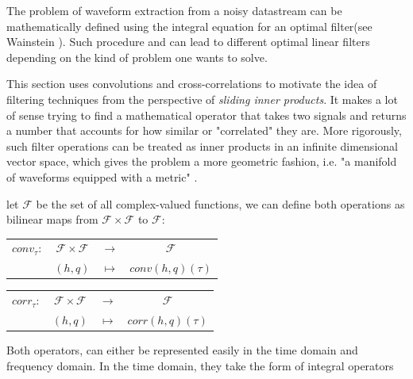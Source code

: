 The problem of waveform extraction from a noisy datastream can be mathematically defined using the integral equation for an optimal filter(see Wainstein \cite[chapter X]{Wainstein:1962vrq}). Such procedure and can lead to different optimal linear filters depending on the kind of problem one wants to solve. 

This section uses convolutions and cross-correlations to motivate the idea of filtering techniques from the perspective of \textit{sliding inner products}. It makes a lot of sense trying to find a mathematical operator that takes two signals and returns a number that accounts for how similar or "correlated" they are. More rigorously, such filter operations can be treated as inner products in an infinite dimensional vector space, which gives the problem a more geometric fashion, i.e. "a manifold of waveforms equipped with a metric" \cite{Andersson:2019yve,Creighton:2011zz}.

let $\mathcal{F}$ be the set of all complex-valued functions, we can define both operations as bilinear maps from $\mathcal{F}\times\mathcal{F}$ to $\mathcal{F}$:

\vspace{1cm}

\begin{center}

\begin{tabular}{cccc}
$conv_\tau:$&$\mathcal{F}\times\mathcal{F}$ & $\rightarrow$ & $\mathcal{F}$ \\
&$(h, q)$ &$\mapsto$ & $conv(h,q)(\tau)$
\end{tabular}

\end{center}

\vspace{1cm}

\begin{center}

\begin{tabular}{cccc}
$corr_\tau:$&$\mathcal{F}\times\mathcal{F}$ & $\rightarrow$ & $\mathcal{F}$ \\
&$(h, q)$ &$\mapsto$ & $corr(h,q)(\tau)$
\end{tabular}

\end{center}

\vspace{1cm}

Both operators, can either be represented easily in the time domain and frequency domain. In the time domain, they take the form of integral operators 

